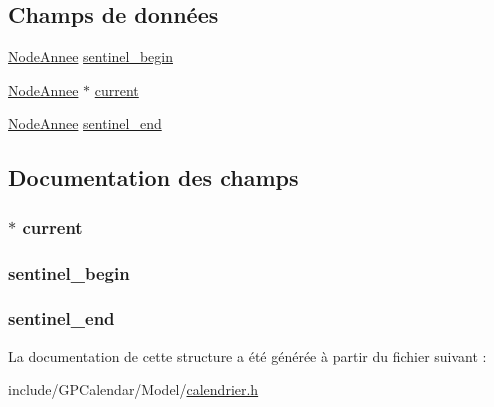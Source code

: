 \subsection*{Champs de données}
\begin{DoxyCompactItemize}
\item 
\hyperlink{struct_node_annee}{Node\-Annee} \hyperlink{struct_list_annee_a8e3c43a4e3e1420a9a6054eea884106e}{sentinel\-\_\-begin}
\item 
\hyperlink{struct_node_annee}{Node\-Annee} $\ast$ \hyperlink{struct_list_annee_a5f39192750953f444d3b63dea208efb4}{current}
\item 
\hyperlink{struct_node_annee}{Node\-Annee} \hyperlink{struct_list_annee_a402cfcc871ccc44cf40bc211273987d8}{sentinel\-\_\-end}
\end{DoxyCompactItemize}


\subsection{Documentation des champs}
\hypertarget{struct_list_annee_a5f39192750953f444d3b63dea208efb4}{
\subsubsection[{current}]{$\ast$ current}}\label{struct_list_annee_a5f39192750953f444d3b63dea208efb4}
\hypertarget{struct_list_annee_a8e3c43a4e3e1420a9a6054eea884106e}{
\subsubsection[{sentinel\-\_\-begin}]{ sentinel\-\_\-begin}}\label{struct_list_annee_a8e3c43a4e3e1420a9a6054eea884106e}
\hypertarget{struct_list_annee_a402cfcc871ccc44cf40bc211273987d8}{
\subsubsection[{sentinel\-\_\-end}]{ sentinel\-\_\-end}}\label{struct_list_annee_a402cfcc871ccc44cf40bc211273987d8}


La documentation de cette structure a été générée à partir du fichier suivant \-:\begin{DoxyCompactItemize}
\item 
include/\-G\-P\-Calendar/\-Model/\hyperlink{calendrier_8h}{calendrier.\-h}\end{DoxyCompactItemize}
